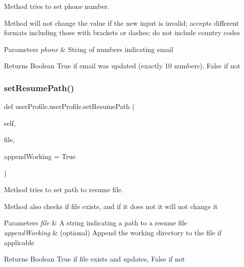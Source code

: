 Method tries to set phone number. 

Method will not change the value if the new input is invalid; accepts different formats including those with brackets or dashes; do not include country codes 
\begin{DoxyParams}{Parameters}
{\em phone} & String of numbers indicating email \\
\hline
\end{DoxyParams}
\begin{DoxyReturn}{Returns}
Boolean True if email was updated (exactly 10 numbers), False if not 
\end{DoxyReturn}
\mbox{\label{classuserProfile_1_1userProfile_ae7ad036942595e2ae9c1247d2c49a63b}} 
\subsubsection{\texorpdfstring{set\+Resume\+Path()}{setResumePath()}}
{\footnotesize\ttfamily def user\+Profile.\+user\+Profile.\+set\+Resume\+Path (\begin{DoxyParamCaption}\item[{}]{self,  }\item[{}]{file,  }\item[{}]{append\+Working = {\ttfamily True} }\end{DoxyParamCaption})}



Method tries to set path to resume file. 

Method also checks if file exists, and if it does not it will not change it 
\begin{DoxyParams}{Parameters}
{\em file} & A string indicating a path to a resume file \\
\hline
{\em append\+Working} & (optional) Append the working directory to the file if applicable \\
\hline
\end{DoxyParams}
\begin{DoxyReturn}{Returns}
Boolean True if file exists and updates, False if not 
\end{DoxyReturn}
\mbox{\label{classuserProfile_1_1userProfile_a67fc7d06910ee0cb4914884dff2ef28e}} 
